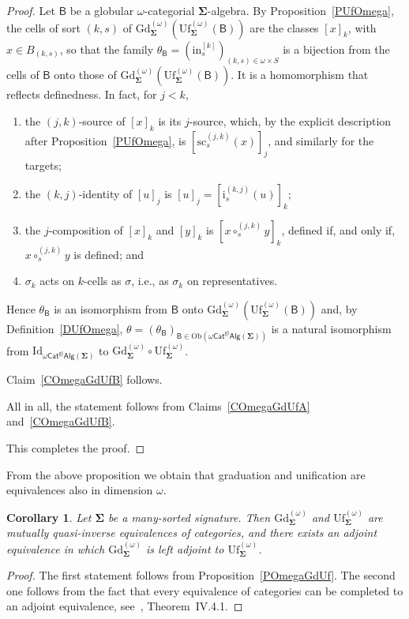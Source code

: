 \documentclass[a4paper, reqno
]{amsart}
\newcommand{\sig}[1]{\mathbf{#1}}             %
\newcommand{\calg}[1]{\boldsymbol{\mathsf{#1}}} %
\newcommand{\Id}{\mathrm{Id}}
\newcommand{\gl}{\mathrm{gl}}                %
\newcommand{\src}{\mathrm{sc}}
\newcommand{\Gd}{\mathrm{Gd}}
\newcommand{\Uf}{\mathrm{Uf}}
\theoremstyle{plain}
\newtheorem{corollary}[theorem]{Corollary}
\theoremstyle{definition}
\begin{document}
\begin{proof}
Let $\calg{B}$ be a globular $\omega$-categorial $\sig{\Sigma}$-algebra.
By Proposition~\ref{PUfOmega}, the cells of sort $(k,s)$ of $\Gd^{(\omega)}_{\sig{\Sigma}}(\Uf^{(\omega)}_{\sig{\Sigma}}(\calg{B}))$ are the classes $[x]_{k}$, with $x\in B_{(k,s)}$, so that the family $\theta_{\calg{B}}=(\mathrm{in}^{[k]}_{s})_{(k,s)\in\omega\times S}$ is a bijection from the cells of $\calg{B}$ onto those of $\Gd^{(\omega)}_{\sig{\Sigma}}(\Uf^{(\omega)}_{\sig{\Sigma}}(\calg{B}))$.
It is a homomorphism that reflects definedness.
In fact, for $j<k$,
\begin{enumerate}
\item the $(j,k)$-source of $[x]_{k}$ is its $j$-source, which, by the explicit description after Proposition~\ref{PUfOmega}, is $[\src^{(j,k)}_{s}(x)]_{j}$, and similarly for the targets;
\item the $(k,j)$-identity of $[u]_{j}$ is $[u]_{j}=[\mathrm{i}^{(k,j)}_{s}(u)]_{k}$;
\item the $j$-composition of $[x]_{k}$ and $[y]_{k}$ is $[x\circ^{(j,k)}_{s}y]_{k}$, defined if, and only if, $x\circ^{(j,k)}_{s}y$ is defined; and
\item $\sigma_{k}$ acts on $k$-cells as $\sigma$, i.e., as $\sigma_{k}$ on representatives.
\end{enumerate}
Hence $\theta_{\calg{B}}$ is an isomorphism from $\calg{B}$ onto $\Gd^{(\omega)}_{\sig{\Sigma}}(\Uf^{(\omega)}_{\sig{\Sigma}}(\calg{B}))$ and, by Definition~\ref{DUfOmega}, $\theta=(\theta_{\calg{B}})_{\calg{B}\in\mathrm{Ob}(\omega\mathsf{Cat}^{\gl}\mathsf{Alg}(\sig{\Sigma}))}$ is a natural isomorphism from $\Id_{\omega\mathsf{Cat}^{\gl}\mathsf{Alg}(\sig{\Sigma})}$ to $\Gd^{(\omega)}_{\sig{\Sigma}}\circ\Uf^{(\omega)}_{\sig{\Sigma}}$.

Claim~\ref{COmegaGdUfB} follows.

All in all, the statement follows from Claims~\ref{COmegaGdUfA} and~\ref{COmegaGdUfB}.

This completes the proof.
\end{proof}

From the above proposition we obtain that graduation and unification are equivalences also in dimension $\omega$.

\begin{corollary}\label{COmegaGdUfEquiv}
Let $\sig{\Sigma}$ be a many-sorted signature.
Then $\Gd^{(\omega)}_{\sig{\Sigma}}$ and $\Uf^{(\omega)}_{\sig{\Sigma}}$ are mutually quasi-inverse equivalences of categories, and there exists an adjoint equivalence in which $\Gd^{(\omega)}_{\sig{\Sigma}}$ is left adjoint to $\Uf^{(\omega)}_{\sig{\Sigma}}$.
\end{corollary}
\begin{proof}
The first statement follows from Proposition~\ref{POmegaGdUf}.
The second one follows from the fact that every equivalence of categories can be completed to an adjoint equivalence, see~\cite{sM98}, Theorem~IV.4.1.
\end{proof}
\end{document}
